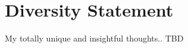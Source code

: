 \pagestyle{plain}
\chapter[Diversity Statement][Diversity Statement]{Diversity Statement}

My totally unique and insightful thoughts.. TBD